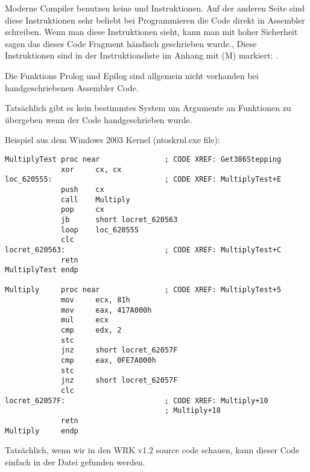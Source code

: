 Moderne Compiler benutzen keine  und  Instruktionen.
Auf der anderen Seite sind diese Instruktionen sehr beliebt bei Programmieren die Code direkt in Assembler schreiben.
Wenn man diese Instruktionen sieht, kann man mit hoher Sicherheit sagen das dieses Code Fragment h\"andisch geschrieben wurde.,
Diese Instruktionen sind in der Instruktionsliste im Anhang mit (M) markiert: .

\par

Die Funktions Prolog und Epilog sind allgemein nicht vorhanden bei handgeschriebenen Assembler Code.
\par

Tats\"achlich gibt es kein bestimmtes System um Argumente an Funktionen zu \"ubergeben wenn der Code handgeschrieben wurde. 

\par
Beispiel aus dem Windows 2003 Kernel
(ntoskrnl.exe file):

\begin{lstlisting}[style=customasmx86]
MultiplyTest proc near               ; CODE XREF: Get386Stepping
             xor     cx, cx
loc_620555:                          ; CODE XREF: MultiplyTest+E
             push    cx
             call    Multiply
             pop     cx
             jb      short locret_620563
             loop    loc_620555
             clc
locret_620563:                       ; CODE XREF: MultiplyTest+C
             retn
MultiplyTest endp

Multiply     proc near               ; CODE XREF: MultiplyTest+5
             mov     ecx, 81h
             mov     eax, 417A000h
             mul     ecx
             cmp     edx, 2
             stc
             jnz     short locret_62057F
             cmp     eax, 0FE7A000h
             stc
             jnz     short locret_62057F
             clc
locret_62057F:                       ; CODE XREF: Multiply+10
                                     ; Multiply+18
             retn
Multiply     endp
\end{lstlisting}

Tats\"achlich, wenn wir in den 
\ac{WRK} v1.2 source code schauen,
kann dieser Code einfach in der Datei
 gefunden werden.
